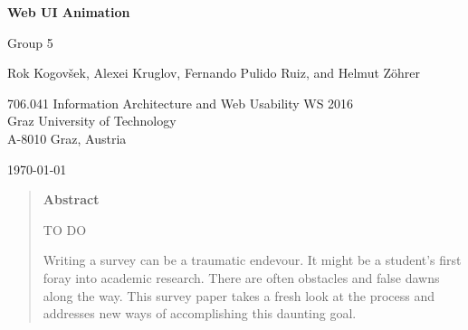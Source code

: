 \documentclass[11pt,onecolumn,twoside]{report}
\begin{document}
\keithdate

\normalsize
\pagestyle{empty}         %




\begin{titlepage}

\begin{center}
{\Large \sffamily \bfseries Web UI Animation}

\vspace{1cm}


{\large\sffamily Group 5}

\vspace{5mm}

{\large\sffamily Rok Kogovšek, Alexei Kruglov, Fernando Pulido Ruiz, and Helmut Zöhrer}

\vspace{1cm}



{\large
706.041 Information Architecture and Web Usability WS 2016 \\
Graz University of Technology \\
A-8010 Graz, Austria  \\[1cm]
}

\vspace{1cm}


{\large \today}


\end{center}



\vspace{2cm}

\begin{quote}
\begin{center}
{\large\sffamily\bfseries Abstract}
\end{center}

TO DO

Writing a survey can be a traumatic endevour. It might be a student's
first foray into academic research. There are often obstacles and
false dawns along the way. This survey paper takes a fresh look at the
process and addresses new ways of accomplishing this daunting goal.


\end{quote}
\end{titlepage}
\end{document}
